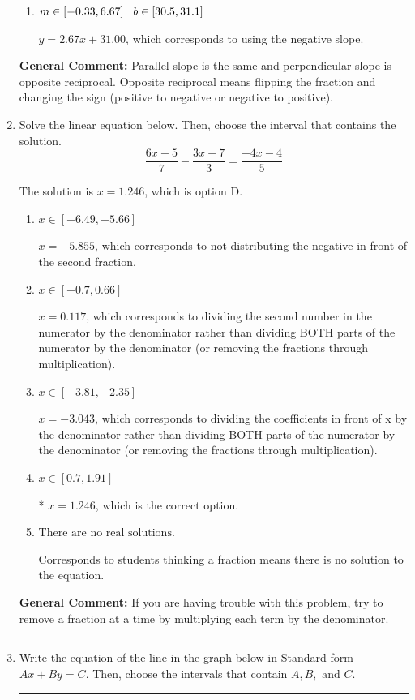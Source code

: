 \documentclass{extbook}[14pt]
\newcommand{\litem}[1]{\item #1

\rule{\textwidth}{0.4pt}}
\begin{document}
\begin{enumerate}
{\begin{enumerate}[label=\Alph*.]
 $y = -0.38x - 17.00$, which corresponds to using the reciprocal slope $(1/m)$.
\item \( m \in [-0.33, 6.67] \hspace*{3mm} b \in [30.5, 31.1] \)

 $y = 2.67x + 31.00$, which corresponds to using the negative slope.
\end{enumerate}

\textbf{General Comment:} Parallel slope is the same and perpendicular slope is opposite reciprocal. Opposite reciprocal means flipping the fraction and changing the sign (positive to negative or negative to positive).
}
\litem{
Solve the linear equation below. Then, choose the interval that contains the solution.
\[ \frac{6x + 5}{7} - \frac{3x + 7}{3} = \frac{-4x -4}{5} \]

The solution is \( x = 1.246 \), which is option D.\begin{enumerate}[label=\Alph*.]
\item \( x \in [-6.49, -5.66] \)

 $x = -5.855$, which corresponds to not distributing the negative in front of the second fraction.
\item \( x \in [-0.7, 0.66] \)

 $x = 0.117$, which corresponds to dividing the second number in the numerator by the denominator rather than dividing BOTH parts of the numerator by the denominator (or removing the fractions through multiplication).
\item \( x \in [-3.81, -2.35] \)

 $x = -3.043$, which corresponds to dividing the coefficients in front of x by the denominator rather than dividing BOTH parts of the numerator by the denominator (or removing the fractions through multiplication).
\item \( x \in [0.7, 1.91] \)

* $x = 1.246$, which is the correct option.
\item \( \text{There are no real solutions.} \)

Corresponds to students thinking a fraction means there is no solution to the equation.
\end{enumerate}

\textbf{General Comment:} If you are having trouble with this problem, try to remove a fraction at a time by multiplying each term by the denominator.
}
\litem{
Write the equation of the line in the graph below in Standard form $Ax+By=C$. Then, choose the intervals that contain $A, B, \text{ and } C$.

}
\end{enumerate}
\end{document}
